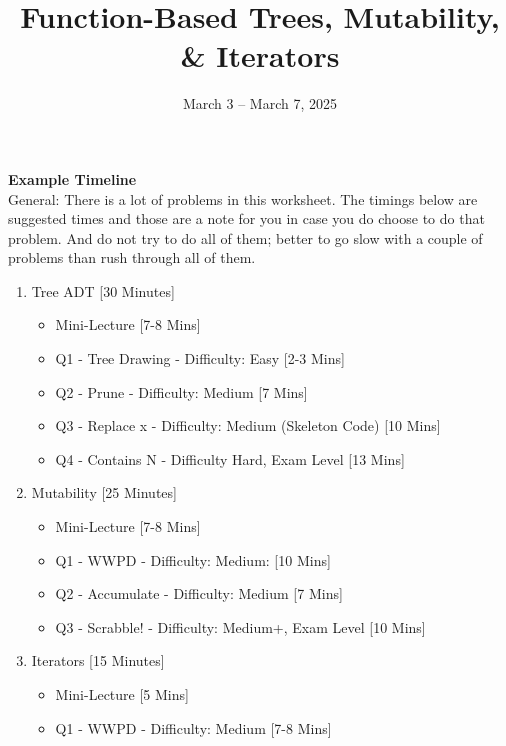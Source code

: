 \documentclass{exam}
\title{Function-Based Trees, Mutability, \& Iterators}
\date{March 3 -- March 7, 2025}
\begin{document}
\maketitle

\begin{meta}
    \textbf{Example Timeline}\\
    General: There is a lot of problems in this worksheet. The timings below are suggested times and those are a note for you in case you do choose to do that problem. And do not try to do all of them; better to go slow with a couple of problems than rush through all of them.
    \begin{enumerate}
        \item Tree ADT [30 Minutes] {\begin{itemize} 
        \item Mini-Lecture [7-8 Mins]
        \item Q1 - Tree Drawing - Difficulty: Easy [2-3 Mins]
        \item Q2 - Prune - Difficulty: Medium [7 Mins]
        \item Q3 - Replace x - Difficulty: Medium (Skeleton Code) [10 Mins]
        \item Q4 - Contains N - Difficulty Hard, Exam Level [13 Mins]
        \end{itemize}}
        \item Mutability [25 Minutes] {\begin{itemize} 
            \item Mini-Lecture [7-8 Mins]
            \item Q1 - WWPD - Difficulty: Medium: [10 Mins]
            \item Q2 - Accumulate - Difficulty: Medium [7 Mins]
            \item Q3 - Scrabble! - Difficulty: Medium+, Exam Level [10 Mins]
        \end{itemize}}
        \item Iterators [15 Minutes] {\begin{itemize} 
            \item Mini-Lecture [5 Mins]
            \item Q1 - WWPD - Difficulty: Medium [7-8 Mins]
        \end{itemize}}
    \end{enumerate}
\end{meta}
\end{document}

